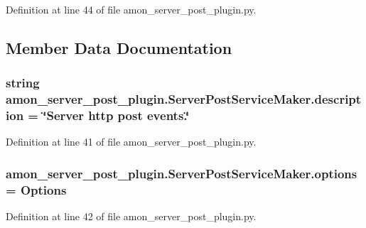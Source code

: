 Definition at line 44 of file amon\-\_\-server\-\_\-post\-\_\-plugin.\-py.



\subsection{Member Data Documentation}
\hypertarget{classamon__server__post__plugin_1_1_server_post_service_maker_a05bfe6bb700fdc34664821194f6fec3b}{
\subsubsection[{description}]{\setlength{\rightskip}{0pt plus 5cm}string amon\-\_\-server\-\_\-post\-\_\-plugin.\-Server\-Post\-Service\-Maker.\-description = \char`\"{}Server http post events.\char`\"{}\hspace{0.3cm}{\ttfamily [static]}}}\label{classamon__server__post__plugin_1_1_server_post_service_maker_a05bfe6bb700fdc34664821194f6fec3b}


Definition at line 41 of file amon\-\_\-server\-\_\-post\-\_\-plugin.\-py.

\hypertarget{classamon__server__post__plugin_1_1_server_post_service_maker_aa21d745291714b83201f517a73e6c0ef}{
\subsubsection[{options}]{\setlength{\rightskip}{0pt plus 5cm}amon\-\_\-server\-\_\-post\-\_\-plugin.\-Server\-Post\-Service\-Maker.\-options = {\bf Options}\hspace{0.3cm}{\ttfamily [static]}}}\label{classamon__server__post__plugin_1_1_server_post_service_maker_aa21d745291714b83201f517a73e6c0ef}


Definition at line 42 of file amon\-\_\-server\-\_\-post\-\_\-plugin.\-py.

